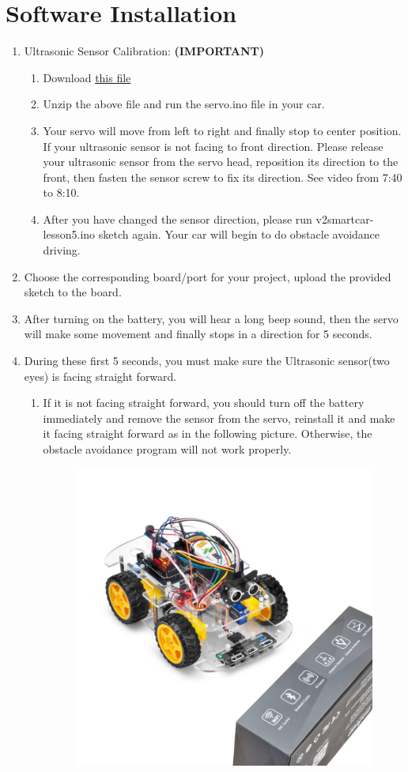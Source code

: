 \documentclass{article}
\begin{document}
\section{Software Installation}
\begin{enumerate}
	\item Ultrasonic Sensor Calibration: {\color{red}\textbf{(IMPORTANT)}}
	\begin{enumerate}[label=\alph*.]
		\item Download \href{https://osoyoo.com/driver/arduino_servo_car/servo.zip}{this file}
		
		\item Unzip the above file and run the servo.ino file in your car.
		
		\item Your servo will move from left to right and finally stop to center position. If your ultrasonic sensor is not facing to front direction. Please release your ultrasonic sensor from the servo head, reposition its direction to the front, then fasten the sensor screw to fix its direction.  See video from 7:40 to 8:10.
		
		\item After you have changed the sensor direction, please run v2smartcar-lesson5.ino sketch again. Your car will begin to do obstacle avoidance driving.
	\end{enumerate}
	
	\item Choose the corresponding board/port for your project, upload the provided sketch to the board.
	
	\item After turning on the battery, you will hear a long beep sound, then the servo will make some movement and finally stops in a direction for 5 seconds.
	
	\item During these first 5 seconds, you must make sure the Ultrasonic sensor(two eyes) is facing straight forward.
	\begin{enumerate}[label=\alph*.]
		\item If it is not facing straight forward, you should turn off the battery immediately and remove the sensor from the servo, reinstall it and make it facing straight forward as in the following picture. Otherwise, the obstacle avoidance program will not work properly.
		
		\begin{figure}[H]
			\centering
			\includegraphics[width=0.5\linewidth]{Images/s4}
			\label{fig:s4}
		\end{figure}
		

\end{enumerate}
\end{enumerate}
\end{document}
